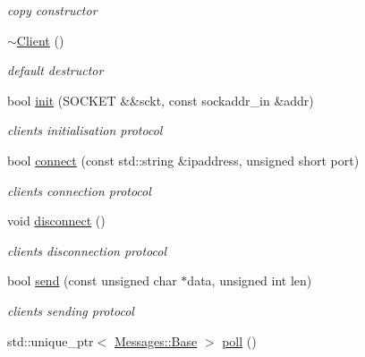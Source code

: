 \begin{DoxyCompactItemize}
\begin{DoxyCompactList}\small\item\em copy constructor \end{DoxyCompactList}\item 
\mbox{\label{class_network_1_1_t_c_p_1_1_client_a149dfc62245dfedcc53bd60b463058ad}} 
\hyperlink{class_network_1_1_t_c_p_1_1_client_a149dfc62245dfedcc53bd60b463058ad}{$\sim$\+Client} ()
\begin{DoxyCompactList}\small\item\em default destructor \end{DoxyCompactList}\item 
bool \hyperlink{class_network_1_1_t_c_p_1_1_client_a3163413dc374bd5483eae9000a54ccfd}{init} (S\+O\+C\+K\+ET \&\&sckt, const sockaddr\+\_\+in \&addr)
\begin{DoxyCompactList}\small\item\em client\textquotesingle{}s initialisation protocol \end{DoxyCompactList}\item 
bool \hyperlink{class_network_1_1_t_c_p_1_1_client_a43d4da1617070a9ce3e7833c2ee7b4a0}{connect} (const std\+::string \&ipaddress, unsigned short port)
\begin{DoxyCompactList}\small\item\em client\textquotesingle{}s connection protocol \end{DoxyCompactList}\item 
\mbox{\label{class_network_1_1_t_c_p_1_1_client_a5cc4376052a6c472e6ff3f42d28f8b5c}} 
void \hyperlink{class_network_1_1_t_c_p_1_1_client_a5cc4376052a6c472e6ff3f42d28f8b5c}{disconnect} ()
\begin{DoxyCompactList}\small\item\em client\textquotesingle{}s disconnection protocol \end{DoxyCompactList}\item 
bool \hyperlink{class_network_1_1_t_c_p_1_1_client_aace9752c2eebba46ed246c3f36509348}{send} (const unsigned char $\ast$data, unsigned int len)
\begin{DoxyCompactList}\small\item\em client\textquotesingle{}s sending protocol \end{DoxyCompactList}\item 
std\+::unique\+\_\+ptr$<$ \hyperlink{class_network_1_1_messages_1_1_base}{Messages\+::\+Base} $>$ \hyperlink{class_network_1_1_t_c_p_1_1_client_af12a7cc81c93af23e55e1eceeb4a1b38}{poll} ()

\end{DoxyCompactItemize}
